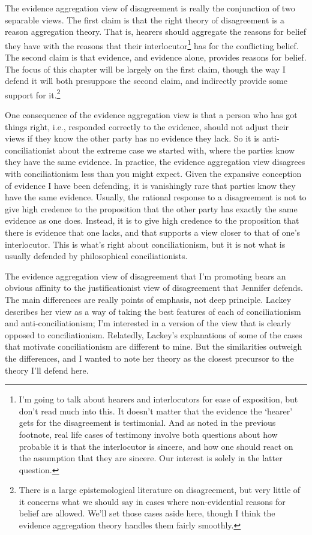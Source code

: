 The evidence aggregation view of disagreement is really the conjunction of two separable views. The first claim is that the right theory of disagreement is a reason aggregation theory. That is, hearers should aggregate the reasons for belief they have with the reasons that their interlocutor\footnote{I'm going to talk about hearers and interlocutors for ease of exposition, but don't read much into this. It doesn't matter that the evidence the `hearer' gets for the disagreement is testimonial. And as noted in the previous footnote, real life cases of testimony involve both questions about how probable it is that the interlocutor is sincere, and how one should react on the assumption that they are sincere. Our interest is solely in the latter question.} has for the conflicting belief. The second claim is that evidence, and evidence alone, provides reasons for belief. The focus of this chapter will be largely on the first claim, though the way I defend it will both presuppose the second claim, and indirectly provide some support for it.\footnote{There is a large epistemological literature on disagreement, but very little of it concerns what we should say in cases where non-evidential reasons for belief are allowed. We'll set those cases aside here, though I think the evidence aggregation theory handles them fairly smoothly.}

One consequence of the evidence aggregation view is that a person who has got things right, i.e., responded correctly to the evidence, should not adjust their views if they know the other party has no evidence they lack. So it is anti-conciliationist about the extreme case we started with, where the parties know they have the same evidence. In practice, the evidence aggregation view disagrees with conciliationism less than you might expect. Given the expansive conception of evidence I have been defending, it is vanishingly rare that parties know they have the same evidence. Usually, the rational response to a disagreement is not to give high credence to the proposition that the other party has exactly the same evidence as one does. Instead, it is to give high credence to the proposition that there is evidence that one lacks, and that supports a view closer to that of one's interlocutor. This is what's right about conciliationism, but it is not what is usually defended by philosophical conciliationists.

The evidence aggregation view of disagreement that I'm promoting bears an obvious affinity to the justificationist view of disagreement that Jennifer \citet{Lackey2010} defends. The main differences are really points of emphasis, not deep principle. Lackey describes her view as a way of taking the best features of each of conciliationism and anti-conciliationism; I'm interested in a version of the view that is clearly opposed to conciliationism. Relatedly, Lackey's explanations of some of the cases that motivate conciliationism are different to mine. But the similarities outweigh the differences, and I wanted to note her theory as the closest precursor to the theory I'll defend here.

